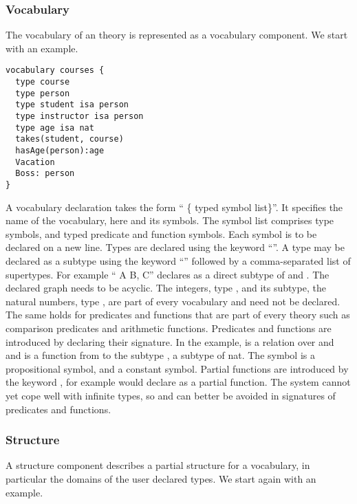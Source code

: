 \subsubsection{Vocabulary}
The vocabulary of an \foidaggpft theory is represented as a vocabulary
component. We start with an example.

\begin{lstlisting}
vocabulary courses {
  type course	
  type person
  type student isa person
  type instructor isa person
  type age isa nat
  takes(student, course)
  hasAge(person):age
  Vacation
  Boss: person
}
\end{lstlisting}

A vocabulary declaration takes the form ``  \{  typed symbol list\}''. It specifies
the name of the vocabulary, here  and its symbols. The
symbol list comprises type symbols, and typed predicate and function symbols.  Each symbol is to be declared on a new
line. Types are declared using the keyword ``''. 
A type may be declared as a subtype using  the keyword
``'' followed by a comma-separated list of supertypes.  For example 
`` A  B, C'' declares  as a direct subtype of  and . The declared  graph needs to be  acyclic.
The integers, type , and
its subtype, the natural numbers, type , are part of every
vocabulary and need not be declared. The same holds for predicates and
functions that are part of every \foidaggpft theory such as comparison
predicates and arithmetic functions.  Predicates and functions are
introduced by declaring their signature. In the example,  is a relation over 
and  and  is a function from  to
the subtype ,  a subtype of nat. The symbol  is a propositional symbol, and   a constant symbol. Partial
functions are introduced by the keyword , for example
 would declare  as a partial
function. The \idp system cannot yet cope well with infinite types, so
 and  can better be avoided in signatures of
predicates and functions.

\subsubsection{Structure}
A structure component describes a partial structure for a vocabulary,
in particular the domains of the user declared types. We start again
with an example.

